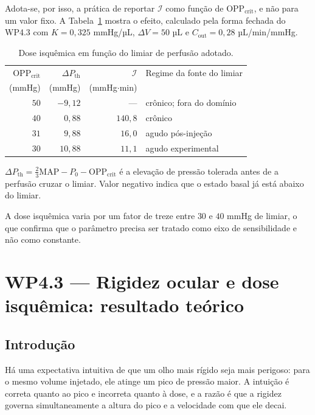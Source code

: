 Adota-se, por isso, a prática de reportar $\mathcal{I}$ como função de $\mathrm{OPP}_{\mathrm{crit}}$, e não para um valor fixo. A Tabela~\ref{tab:wp42_opp_crit} mostra o efeito, calculado pela forma fechada do WP4.3 com $K=0{,}325$ mmHg/µL, $\Delta V=50$ µL e $C_{\mathrm{out}}=0{,}28$ µL/min/mmHg.

\begin{table}[h]
\centering
\caption{Dose isquêmica em função do limiar de perfusão adotado.}
\label{tab:wp42_opp_crit}
\begin{tabular}{@{}rrrl@{}}
\toprule
$\mathrm{OPP}_{\mathrm{crit}}$ & $\Delta P_{\mathrm{th}}$ & $\mathcal{I}$ & Regime da fonte do limiar \\
(mmHg) & (mmHg) & (mmHg$\cdot$min) & \\
\midrule
$50$ & $-9{,}12$ & --- & crônico; fora do domínio \\
$40$ & $0{,}88$ & $140{,}8$ & crônico \\
$31$ & $9{,}88$ & $16{,}0$ & agudo pós-injeção \\
$30$ & $10{,}88$ & $11{,}1$ & agudo experimental \\
\bottomrule
\end{tabular}

\vspace{2pt}
\footnotesize $\Delta P_{\mathrm{th}}=\tfrac{2}{3}\mathrm{MAP}-P_{0}-\mathrm{OPP}_{\mathrm{crit}}$ é a elevação de pressão tolerada antes de a perfusão cruzar o limiar. Valor negativo indica que o estado basal já está abaixo do limiar.
\end{table}

A dose isquêmica varia por um fator de treze entre $30$ e $40$ mmHg de limiar, o que confirma que o parâmetro precisa ser tratado como eixo de sensibilidade e não como constante.

\section{WP4.3 --- Rigidez ocular e dose isquêmica: resultado teórico}

\subsection{Introdução}

Há uma expectativa intuitiva de que um olho mais rígido seja mais perigoso: para o mesmo volume injetado, ele atinge um pico de pressão maior. A intuição é correta quanto ao pico e incorreta quanto à dose, e a razão é que a rigidez governa simultaneamente a altura do pico e a velocidade com que ele decai.

